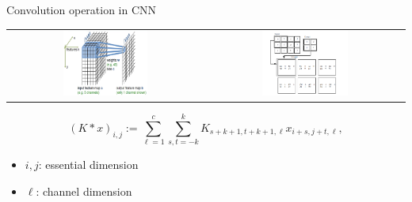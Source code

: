 \documentclass{beamer}
\begin{document}
\begin{CJK*}{UTF8}{gbsn}
\begin{frame}{Convolution operation in CNN}
\begin{tabular}{cc}
\includegraphics[width=0.45\textwidth]{figures/CNNLayer1} & 
\includegraphics[width=0.45\textwidth]{figures/CNNLayer2}
\end{tabular}

\begin{equation}\label{eq:conv}
(K \ast x)_{i,j} :=\sum_{\ell=1}^c \sum_{s, t = -k}^k  K_{s+k+1,t+k+1,\ell} x_{i + s, j + t,\ell},
\end{equation}
\begin{itemize}
\item $i,j$: essential dimension
\item $\ell$: channel dimension
\end{itemize}
\end{frame}


\end{CJK*}
\end{document}
